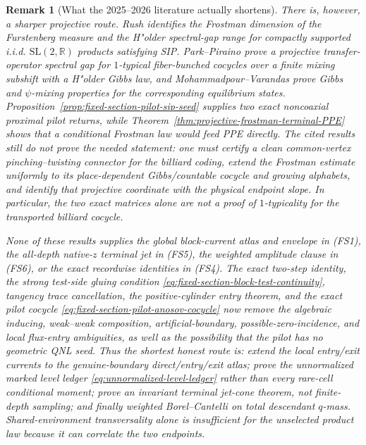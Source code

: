 \documentclass[11pt]{article}
\newtheorem{remark}[theorem]{Remark}
\begin{document}
\begin{remark}[What the 2025--2026 literature actually shortens]
There is, however, a sharper projective route.  Rush
\cite{RushFrostman} identifies the Frostman dimension of the Furstenberg
measure and the H"older spectral-gap range for compactly supported
i.i.d. $\mathrm{SL}(2,\mathbb R)$ products satisfying SIP.
Park--Piraino \cite{ParkPiraino} prove a projective transfer-operator
spectral gap for $1$-typical fiber-bunched cocycles over a finite mixing
subshift with a H"older Gibbs law, and
Mohammadpour--Varandas \cite{MohammadpourVarandas} prove Gibbs and
$\psi$-mixing properties for the corresponding equilibrium states.
Proposition~\ref{prop:fixed-section-pilot-sip-seed} supplies two exact
noncoaxial proximal pilot returns, while
Theorem~\ref{thm:projective-frostman-terminal-PPE} shows that a conditional
Frostman law would feed PPE directly.  The cited results still do not prove
the needed statement: one must certify a clean common-vertex
pinching--twisting connector for the billiard coding, extend the Frostman
estimate uniformly to its place-dependent Gibbs/countable cocycle and
growing alphabets, and identify that projective coordinate with the physical
endpoint slope.  In particular, the two exact matrices alone are not a
proof of $1$-typicality for the transported billiard cocycle.

None of these results supplies the global block-current atlas and envelope
in \textup{(FS1)}, the all-depth
native-$z$ terminal jet in \textup{(FS5)}, the weighted amplitude clause in
\textup{(FS6)}, or the exact recordwise identities in \textup{(FS4)}.
The exact two-step identity, the strong test-side gluing condition
\eqref{eq:fixed-section-block-test-continuity}, tangency trace cancellation,
the positive-cylinder entry theorem, and the exact pilot cocycle
\eqref{eq:fixed-section-pilot-anosov-cocycle} now remove the algebraic inducing,
weak--weak composition, artificial-boundary, possible-zero-incidence, and
local flux-entry ambiguities, as well as the possibility that the pilot has
no geometric QNL seed.  Thus the shortest honest route is: extend the
local entry/exit currents to the genuine-boundary direct/entry/exit atlas;
prove the unnormalized marked level ledger
\eqref{eq:unnormalized-level-ledger} rather than every rare-cell conditional
moment; prove an invariant terminal jet-cone theorem,
not finite-depth sampling; and finally weighted Borel--Cantelli on total
descendant $q$-mass.  Shared-environment transversality alone is insufficient
for the unselected product law because it can correlate the two endpoints.
\end{remark}
\end{document}
